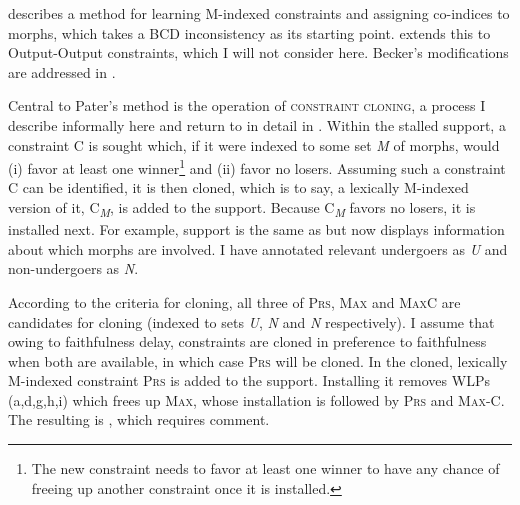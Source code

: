 \documentclass[output=paper,
modfonts
]{LSP/langsci}
\begin{document}
\citet{pater2009r} describes a method for learning M-indexed constraints and assigning co-indices to morphs, which takes a BCD inconsistency as its starting point. \citet{coetzee2009} extends this to Output-Output constraints, which I will not consider here. Becker's modifications \citep{becker2009,becker2011r} are addressed in . 

Central to Pater's method is the operation of \textsc{constraint cloning}, a process I describe informally here and return to in detail in . Within the stalled support, a constraint C is sought which, if it were indexed to some set \textit{M} of morphs, would (i) favor at least one winner\footnote{The new constraint needs to favor at least one winner to have any chance of freeing up another constraint once it is installed.} and (ii) favor no losers. Assuming such a constraint C can be identified, it is then cloned, which is to say, a lexically M-indexed version of it, C\textit{\textsubscript{M}}, is added to the support. Because C\textit{\textsubscript{M}} favors no losers, it is installed next. For example, support  is the same as  but now displays information about which morphs are involved. I have annotated relevant undergoers as \textit{U} and non-undergoers as \textit{N}.

According to the criteria for cloning, all three of \textsc{Prs,} \textsc{Max} and \textsc{MaxC} are candidates for cloning (indexed to sets \textit{U}, \textit{N} and \textit{N} respectively). I assume that owing to faithfulness delay,  constraints are cloned in preference to faithfulness when both are available, in which case \textsc{Prs} will be cloned. In  the cloned, lexically M-indexed constraint \textsc{Prs} is added to the support. Installing it removes WLPs (a,d,g,h,i) which frees up \textsc{Max,} whose installation is followed by \textsc{Prs} and \textsc{Max-C}. The resulting  is , which requires comment.
\end{document}
